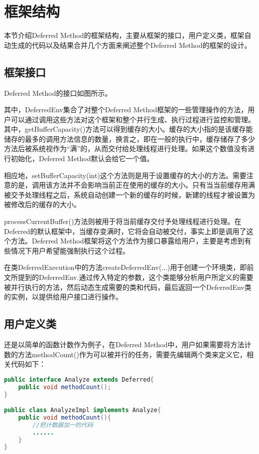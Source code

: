 \section{框架结构}

本节介绍Deferred Method的框架结构，主要从框架的接口，用户定义类，框架自动生成的代码以及结果合并几个方面来阐述整个Deferred Method的框架的设计。

\subsection{框架接口}

Deferred Method的接口如图所示。


其中，DeferredEnv集合了对整个Deferred Method框架的一些管理操作的方法，用户可以通过调用这些方法对这个框架和整个并行生成、执行过程进行监控和管理。其中，getBufferCapacity()方法可以得到缓存的大小。缓存的大小指的是该缓存能储存的最多的调用方法信息的数量，换言之，即在一般的执行中，缓存储存了多少方法后被系统视作为“满”的，从而交付给处理线程进行处理。如果这个数值没有进行初始化，Deferred Method默认会给它一个值。

相应地，setBufferCapacity(int)这个方法则是用于设置缓存的大小的方法。需要注意的是，调用该方法并不会影响当前正在使用的缓存的大小。只有当当前缓存用满被交予处理线程之后，系统自动创建一个新的缓存的时候，新建的线程才被设置为被修改后的缓存的大小。

processCurrentBuffer()方法则被用于将当前缓存交付予处理线程进行处理。在Deferred的默认框架中，当缓存变满时，它将会自动被交付，事实上即是调用了这个方法。Deferred Method框架将这个方法作为接口暴露给用户，主要是考虑到有些情况下用户希望能强制执行这个过程。

在类DeferredExecution中的方法createDeferredEnv(...)用于创建一个环境类，即前文所提到的DeferredEnv.通过传入特定的参数，这个类能够分析用户所定义的需要被并行执行的方法，然后动态生成需要的类和代码，最后返回一个DeferredEnv类的实例，以提供给用户接口进行操作。

\subsection{用户定义类}

还是以简单的函数计数作为例子，在Deferred Method中，用户如果需要将方法计数的方法methodCount()作为可以被并行的任务，需要先编辑两个类来定义它，相关代码如下：

\begin{lstlisting}[language=Java]
public interface Analyze extends Deferred{
	public void methodCount();
}

public class AnalyzeImpl implements Analyze{
	public void methodCount(){
		//把计数器加一的代码
		......
	}
}
\end{lstlisting}

